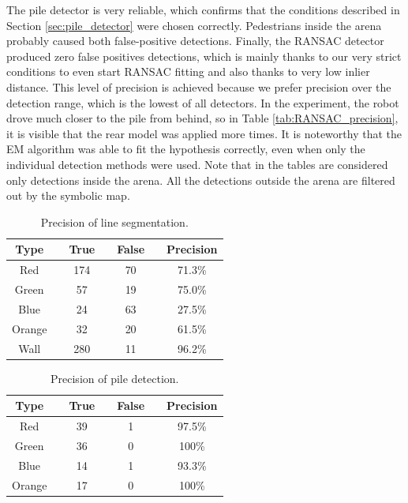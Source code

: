 The pile detector is very reliable, which confirms that the conditions described in Section \ref{sec:pile_detector} were chosen correctly. Pedestrians inside the arena probably caused both false-positive detections. Finally, the RANSAC detector produced zero false positives detections, which is mainly thanks to our very strict conditions to even start RANSAC fitting and also thanks to very low inlier distance. This level of precision is achieved because we prefer precision over the detection range, which is the lowest of all detectors. In the experiment, the robot drove much closer to the pile from behind, so in Table \ref{tab:RANSAC_precision}, it is visible that the rear model was applied more times. It is noteworthy that the EM algorithm was able to fit the hypothesis correctly, even when only the individual detection methods were used. Note that in the tables are considered only detections inside the arena. All the detections outside the arena are filtered out by the symbolic map.

\begin{table}[H]
	\centering
	\caption{Precision of line segmentation.}
	\begin{tabular}{ccccccc}
		\toprule
		Type &\quad& True &\quad& False &\quad& Precision \\
		\midrule
		Red &\quad& 174 &\quad& 70 &\quad&71.3\% \\
		Green &\quad& 57 &\quad& 19 &\quad& 75.0\% \\
		Blue &\quad& 24 &\quad& 63 &\quad& 27.5\% \\
		Orange &\quad& 32 &\quad& 20 &\quad& 61.5\% \\
		Wall &\quad& 280 &\quad& 11 &\quad& 96.2\% \\
		\bottomrule
	\end{tabular}
	\label{tab:seg_precision}
\end{table}


\begin{table}[H]
	\centering
	\caption{Precision of pile detection.}
	\begin{tabular}{ccccccc}
		\toprule
		Type &\quad& True &\quad& False &\quad& Precision \\
		\midrule
		Red &\quad& 39 &\quad& 1 &\quad& 97.5\% \\
		Green &\quad& 36 &\quad& 0 &\quad& 100\% \\
		Blue &\quad& 14 &\quad& 1 &\quad& 93.3\% \\
		Orange &\quad& 17 &\quad& 0 &\quad& 100\% \\
		\bottomrule
	\end{tabular}
	\label{tab:pile_precision}
\end{table}


